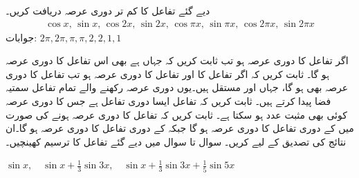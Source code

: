 
\quad دیے گئے تفاعل کا کم تر دوری عرصہ دریافت کریں۔
\begin{align*}
\cos x,\, \sin x,\, \cos 2x,\, \sin 2x,\, \cos \pi x,\, \sin \pi x,\, \cos 2\pi x,\, \sin 2\pi x
\end{align*}
جوابات:\quad
$2\pi, 2\pi,\pi, \pi,2,2,1,1$

\quad اگر تفاعل  کا دوری عرصہ  ہو تب ثابت کریں کہ  جہاں  ہے بھی اس تفاعل کا دوری عرصہ ہو گا۔
\quad ثابت کریں کہ اگر تفاعل  کا  اور تفاعل  کا دوری عرصہ  ہو تب تفاعل  کا دوری عرصہ بھی  ہو گا، جہاں  اور  مستقل ہیں۔یوں دوری عرصہ  رکھنے والے تمام تفاعل سمتیہ فضا پیدا کرتے ہیں۔
\quad ثابت کریں کہ تفاعل  ایسا دوری تفاعل ہے جس کا دوری عرصہ  کوئی بھی مثبت عدد ہو سکتا ہے۔
\quad ثابت کریں کہ  تفاعل  کا دوری عرصہ  ہونے کی صورت میں  کے دوری تفاعل   کا دوری عرصہ  ہو گا جبکہ  کے دوری  تفاعل   کا دوری عرصہ  ہو گا۔ان نتائج کی تصدیق  کے لیے کریں۔ 
سوال  تا سوال  میں دیے گئے تفاعل کا ترسیم کھینچیں۔

\quad
$\sin x,\quad \sin x+\frac{1}{3}\sin 3x,\quad \sin x+\frac{1}{3}\sin 3x+\frac{1}{5}\sin 5x$

